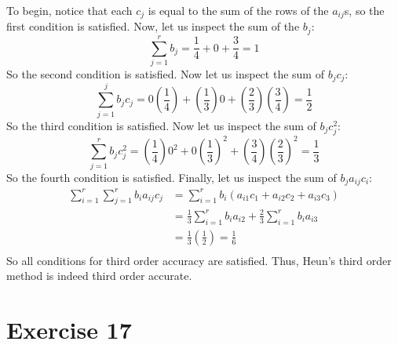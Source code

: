 \documentclass{article}
\begin{document}
To begin, notice that each $c_j$ is equal to the sum of the rows of the $a_{ij}$s, so the first condition is satisfied. Now, let us inspect the sum of the $b_j$:
\[\sum_{j=1}^r b_j = \frac{1}{4} + 0 + \frac{3}{4} = 1\]
So the second condition is satisfied. Now let us inspect the sum of $b_jc_j$:
\[\sum_{j=1}^j b_jc_j = 0\left(\frac{1}{4}\right) + \left(\frac{1}{3}\right)0 + \left(\frac{2}{3}\right)\left(\frac{3}{4}\right) = \frac{1}{2}\]
So the third condition is satisfied. Now let us inspect the sum of $b_jc_j^2$:
\[\sum_{j=1}^r b_jc_j^2 = \left(\frac{1}{4}\right)0^2 + 0\left(\frac{1}{3}\right)^2 + \left(\frac{3}{4}\right)\left(\frac{2}{3}\right)^2 = \frac{1}{3}\]
So the fourth condition is satisfied. Finally, let us inspect the sum of $b_ja_{ij}c_i$:
\begin{align*}
    \sum_{i=1}^r\sum_{j=1}^r b_ia_{ij}c_j &= \sum_{i=1}^rb_i(a_{i1}c_1 + a_{i2}c_2 + a_{i3}c_3) \\
    &= \frac{1}{3}\sum_{i=1}^rb_ia_{i2} + \frac{2}{3}\sum_{i=1}^rb_ia_{i3} \\
    &= \frac{1}{3}\left(\frac{1}{2}\right) = \frac{1}{6} \\
\end{align*}
So all conditions for third order accuracy are satisfied. Thus, Heun's third order method is indeed third order accurate.
\section*{Exercise 17}
\end{document}
